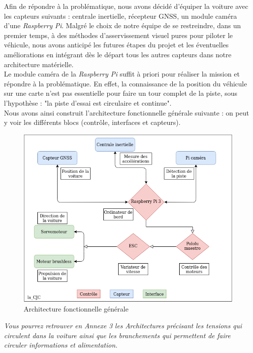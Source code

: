 \documentclass[12pt, openany]{report}
\begin{document}
Afin de répondre à la problématique, nous avons décidé d'équiper la voiture avec les capteurs suivants : centrale inertielle, récepteur \textsc{GNSS}, un module caméra d'une \textit{Raspberry Pi}. Malgré le choix de notre équipe de se restreindre, dans un premier temps, à des méthodes d'asservissement visuel pures pour piloter le véhicule, nous avons anticipé les futures étapes du projet et les éventuelles améliorations en intégrant dès le départ tous les autres capteurs dans notre architecture matérielle.\\

Le module caméra de la \textit{Raspberry Pi} suffit à priori pour réaliser la mission et répondre à la problématique. En effet, la connaissance de la position du véhicule sur une carte n'est pas essentielle pour faire un tour complet de la piste, sous l'hypothèse : "la piste d'essai est circulaire et continue".\\

Nous avons ainsi construit l'architecture fonctionnelle générale suivante : on peut y voir les différents blocs (contrôle, interfaces et capteurs). \\

\begin{figure}[H]
     \centering
     \includegraphics[width=13cm, height = 9cm]{arch_fg.png}
     \caption{Architecture fonctionnelle générale}
     \label{fig:archi_fg}
\end{figure}

\textit{Vous pourrez retrouver en Annexe 3 les Architectures précisant les tensions qui circulent dans la voiture ainsi que les branchements qui permettent de faire circuler informations et alimentation.}\\
\end{document}
